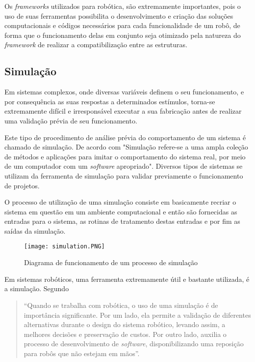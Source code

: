 Os \textit{frameworks} utilizados para robótica, são extremamente importantes, pois o uso de suas ferramentas possibilita o desenvolvimento e criação das soluções computacionais e códigos necessários para cada funcionalidade de um robô, de forma que o funcionamento delas em conjunto seja otimizado pela natureza do \textit{framework} de realizar a compatibilização entre as estruturas.

\subsection{Simulação}\label{sec:simula}

Em sistemas complexos, onde diversas variáveis definem o seu funcionamento, e por consequência as suas respostas a determinados estímulos, torna-se extremamente difícil e irresponsável executar a sua fabricação antes de realizar uma validação prévia de seu funcionamento.

Este tipo de procedimento de análise prévia do comportamento de um sistema é chamado de simulação. De acordo com \cite{definicao_de_simulacao} "Simulação refere-se a uma ampla coleção de métodos e aplicações para imitar o comportamento do sistema real, por meio de um computador com um \textit{software} apropriado". Diversos tipos de sistemas se utilizam da ferramenta de simulação para validar previamente o funcionamento de projetos.

O processo de utilização de uma simulação consiste em basicamente recriar o sistema em questão em um ambiente computacional e então são fornecidas as entradas para o sistema, as rotinas de tratamento destas entradas e por fim as saídas da simulação.

\begin{figure}[h!]												
	\centering												
	\texttt{[image: simulation.PNG]}			
	\caption{Diagrama de funcionamento de um processo de simulação}		
	\label{img:simulation}	
\end{figure}


Em sistemas robóticos, uma ferramenta extremamente útil e bastante utilizada, é a simulação. Segundo \cite{artigo_sobre_simulacao} 
\begin{quote}
“Quando se trabalha com robótica, o uso de uma simulação é de importância significante. Por um lado, ela permite a validação de diferentes alternativas durante o design do sistema robótico, levando assim, a melhores decisões e preservação de custos. Por outro lado, auxilia o processo de desenvolvimento de \textit{software}, disponibilizando uma reposição para robôs que não estejam em mãos”.
\end{quote}


